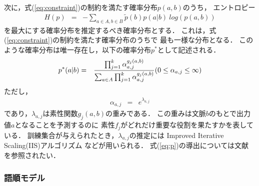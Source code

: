 次に，式(\ref{eq:constraint})の制約を満たす確率分布$p(a,b)$のうち，
エントロピー
\begin{eqnarray}
  \label{eq:entropy}
  H(p) & = & -\sum_{a\in A,b\in B}\tilde{p}(b)p(a|b)\ log\left(p(a,b)\right)
\end{eqnarray}
を最大にする確率分布を推定するべき確率分布とする．
これは，式(\ref{eq:constraint})の制約を満たす確率分布のうちで
最も一様な分布となる．
このような確率分布は唯一存在し，以下の確率分布$p^{*}$として記述される．
\begin{eqnarray}
  \label{eq:p}
  p^{*}(a|b) & = & \frac{\prod_{j=1}^{k}\alpha_{a,j}^{g_{j}(a,b)}}
  {\sum_{a\in A} \prod_{j=1}^{k}\alpha_{a,j}^{g_{j}(a,b)}}
   (0\leq \alpha_{a,j}\leq \infty)
\end{eqnarray}
ただし，
\begin{eqnarray}
  \label{eq:alpha}
  \alpha_{a,j} & = & e^{\lambda_{a,j}}
\end{eqnarray}
であり，$\lambda_{a,j}$は素性関数$g_{j}(a,b)$の重みである．
この重みは文脈$b$のもとで出力値$a$となることを予測するのに
素性$f_{j}$がどれだけ重要な役割を果たすかを表している．
訓練集合が与えられたとき，$\lambda_{a,j}$の推定には
Improved Iterative Scaling(IIS)アルゴリズム
\cite{pietra95}
などが用いられる．
式(\ref{eq:p})の導出については文献
\cite{Jaynes:57,Jaynes:79}
を参照されたい．

\subsubsection{語順モデル}
\label{sec:word_order_model}

